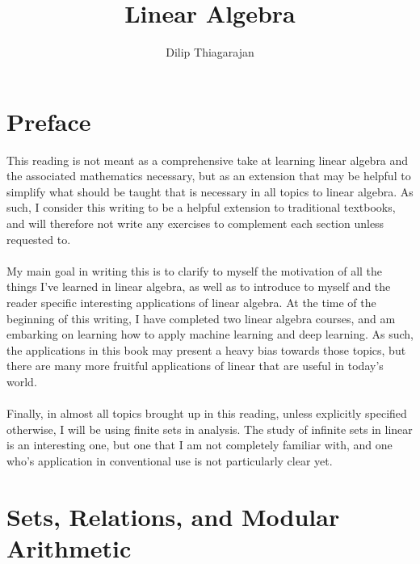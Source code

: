 \documentclass[11pt]{report}
\begin{document}
\title{Linear Algebra}
\author{Dilip Thiagarajan}
\maketitle
\tableofcontents{}
\chapter*{Preface}
This reading is not meant as a comprehensive take at learning linear algebra and the associated mathematics necessary, but as an extension that may be helpful to simplify what should be taught that is necessary in all topics to linear algebra. As such, I consider this writing to be a helpful extension to traditional textbooks, and will therefore not write any exercises to complement each section unless requested to.
\\ \\
My main goal in writing this is to clarify to myself the motivation of all the things I've learned in linear algebra, as well as to introduce to myself and the reader specific interesting applications of linear algebra. At the time of the beginning of this writing, I have completed two linear algebra courses, and am embarking on learning how to apply machine learning and deep learning. As such, the applications in this book may present a heavy bias towards those topics, but there are many more fruitful applications of linear that are useful in today's world.
\\ \\
Finally, in almost all topics brought up in this reading, unless explicitly specified otherwise, I will be using finite sets in analysis. The study of infinite sets in linear is an interesting one, but one that I am not completely familiar with, and one who's application in conventional use is not particularly clear yet.

\chapter{Sets, Relations, and Modular Arithmetic}
\end{document}

